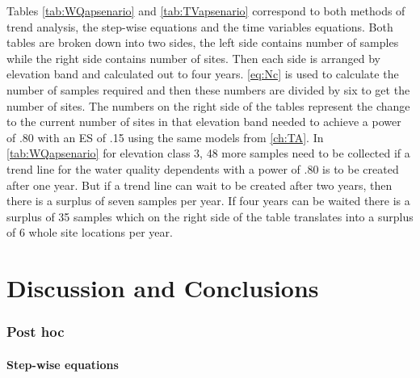 Tables \autoref{tab:WQapsenario} and \autoref{tab:TVapsenario} correspond to both methods of trend analysis, the step-wise equations and the time variables equations.
Both tables are broken down into two sides, the left side contains number of samples while the right side contains number of sites.
Then each side is arranged by elevation band and calculated out to four years.
\autoref{eq:Nc} is used to calculate the number of samples required and then these numbers are divided by six to get the number of sites.
The numbers on the right side of the tables represent the change to the current number of sites in that elevation band needed to achieve a power of .80 with an ES of .15 using the same models from \autoref{ch:TA}.
In \autoref{tab:WQapsenario} for elevation class 3, 48 more samples need to be collected if a trend line for the water quality dependents with a power of .80 is to be created after one year.  
But if a trend line can wait to be created after two years, then there is a surplus of seven samples per year.  
If four years can be waited there is a surplus of 35 samples which on the right side of the table translates into a surplus of 6 whole site locations per year.

\section{Discussion and Conclusions}

\subsubsection{Post hoc}

\paragraph{Step-wise equations}


